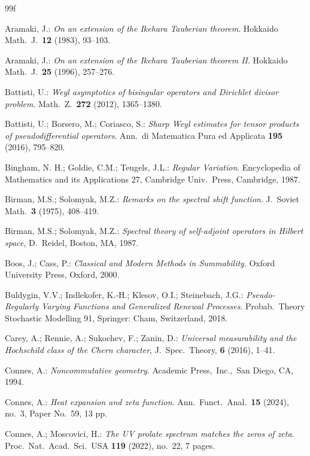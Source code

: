 \documentclass[10pt, a4paper]{amsart}
\numberwithin{equation}{section}
\theoremstyle{definition}
\theoremstyle{remark}
\begin{document}
\begin{thebibliography}{99f}

 Aramaki, J.: \emph{On an extension of the Ikehara Tauberian theorem}. Hokkaido Math.\ J.\ \textbf{12} (1983), 93--103.

 Aramaki, J.: \emph{On an extension of the Ikehara Tauberian theorem II}. Hokkaido Math.\ J.\ \textbf{25} (1996), 257--276.

 Battisti, U.: \emph{Weyl asymptotics of bisingular operators and Dirichlet divisor problem}. Math.\ Z.\ \textbf{272} (2012), 1365--1380.

 Battisti, U.; Borsero, M.; Coriasco, S.: \emph{Sharp Weyl estimates for tensor products of pseudodifferential operators}. Ann.\ di Matematica Pura ed Applicata \textbf{195} (2016), 795--820.

 Bingham, N. H.; Goldie, C.M.; Teugels, J.L.:  \emph{Regular Variation}. Encyclopedia of Mathematics and its Applications 27, Cambridge Univ.\ Press, Cambridge, 1987.

 Birman, M.S.; Solomyak, M.Z.: \emph{Remarks on the spectral shift function}. J.\ Soviet Math.\ \textbf{3} (1975), 408--419.

 Birman, M.S.; Solomyak, M.Z.: \emph{Spectral theory of self-adjoint operators in Hilbert space}, D.\ Reidel, Boston, MA, 1987.

 Boos, J.; Cass, P.: \emph{Classical and Modern Methods in Summability}. Oxford University Press, Oxford, 2000.

 Buldygin, V.V.; Indlekofer, K.-H.; Klesov, O.I.; Steinebach, J.G.: \emph{Pseudo-Regularly Varying Functions and Generalized Renewal Processes}. Probab.\ Theory Stochastic Modelling 91, Springer: Cham, Switzerland, 2018.

 Carey, A.; Rennie, A.; Sukochev, F.; Zanin, D.: \emph{Universal measurability and the Hochschild class of the Chern character}, J.\ Spec.\ Theory, \textbf{6} (2016), 1--41.

 Connes, A.: \emph{Noncommutative geometry}. Academic Press,\ Inc.,\ San Diego, CA, 1994.

 Connes, A.: \emph{Heat expansion and zeta function}. Ann.\ Funct.\ Anal.\ \textbf{15} (2024), no.\ 3, Paper No.\ 59, 13 pp.

 Connes, A.; Moscovici, H.: \emph{The UV prolate spectrum matches the zeros of zeta}. Proc.\ Nat.\ Acad.\ Sci.\ USA \textbf{119} (2022), no.~22, 7 pages.


\end{thebibliography}
\end{document}
